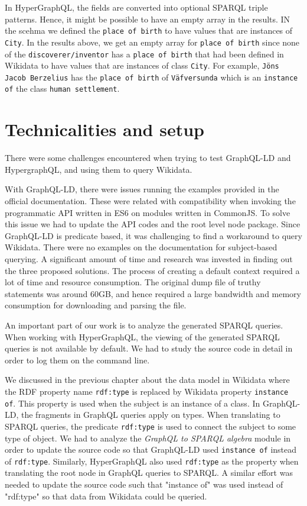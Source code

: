 In HyperGraphQL, the fields are converted into optional SPARQL triple patterns. Hence, it might be possible to have an empty array in the results. IN the scehma we defined the \texttt{place of birth} to have values that are instances of \texttt{City}. In the results above, we get an empty array for \texttt{place of birth} since none of the \texttt{discoverer/inventor} has a \texttt{place of birth} that had been defined in Wikidata to have values that are instances of class \texttt{City}. For example, \texttt{J{\"o}ns Jacob Berzelius} has the \texttt{place of birth} of \texttt{V{\"a}fversunda} which is an \texttt{instance of} the class \texttt{human settlement}.

\section{Technicalities and setup}
There were some challenges encountered when trying to test GraphQL-LD and HypergraphQL, and using them to query Wikidata. 

With GraphQL-LD, there were issues running the examples provided in the official documentation. These were related with compatibility when invoking the programmatic API written in ES6 on modules written in CommonJS. To solve this issue we had to update the API codes and the root level node package. Since GraphQL-LD is predicate based, it was challenging to find a workaround to query Wikidata. There were no examples on the documentation for subject-based querying. A significant amount of time and research was invested in finding out the three proposed solutions. The process of creating a default context required a lot of time and resource consumption. The original dump file of truthy statements was around 60GB, and hence required a large bandwidth and memory consumption for downloading and parsing the file. 

An important part of our work is to analyze the generated SPARQL queries. When working with HyperGraphQL, the viewing of the generated SPARQL queries is not available by default. We had to study the source code in detail in order to log them on the command line. 

We discussed in the previous chapter about the data model in Wikidata where the RDF property name \texttt{rdf:type} is replaced by Wikidata property \texttt{instance of}. This property is used when the subject is an instance of a class. In GraphQL-LD, the fragments in GraphQL queries apply on types. When translating to SPARQL queries, the predicate \texttt{rdf:type} is used to connect the subject to some type of object. We had to analyze the \textit{GraphQL to SPARQL algebra} module in order to update the source code so that GraphQL-LD used \texttt{instance of} instead of \texttt{rdf:type}. Similarly, HyperGraphQL also used \texttt{rdf:type} as the property when translating the root node in GraphQL queries to SPARQL. A similar effort was needed to update the source code such that "instance of" was used instead of "rdf:type" so that data from Wikidata could be queried.

